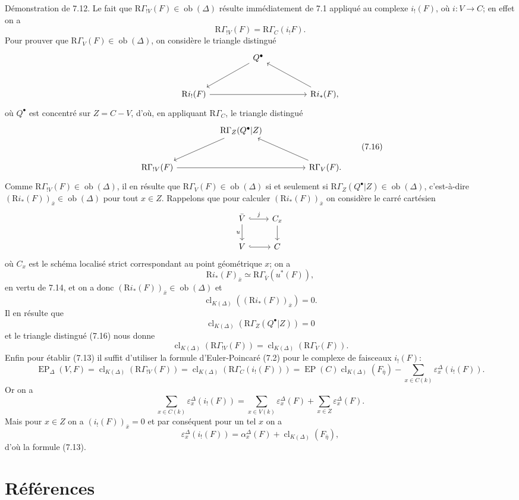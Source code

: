 \documentclass[11pt]{article}
\newcommand{\R}{\mathrm{R}}\newcommand{\RHomCore}{\mathrm{RHom}}
\providecommand{\EP}{\operatorname{EP}}
\providecommand{\Ob}{\operatorname{ob}}
\providecommand{\Ob}{\operatorname{ob}}
\providecommand{\R}{\mathrm R}
\providecommand{\EP}{\operatorname{EP}}
\providecommand{\Ob}{\operatorname{Ob}}
\providecommand{\clK}[1]{\operatorname{cl}_{K(#1)}}
\providecommand{\RG}{\R\Gamma}
\providecommand{\Ob}{\operatorname{ob}}
\providecommand{\Ob}{\operatorname{Ob}}
\begin{document}
Démonstration de 7.12. Le fait que $\RG_{!V}(F)\in\Ob(\Delta)$ résulte immédiatement de 7.1 appliqué au complexe $i_!(F)$, où $i:V\to C$; en effet on a
\[
\RG_{!V}(F)=\RG_C(i_!F).
\]
Pour prouver que $\RG_V(F)\in\Ob(\Delta)$, on considère le triangle distingué
\[
\begin{tikzcd}[column sep=huge,row sep=large]
& Q^\bullet \arrow[dl] &\\
\R i_!(F) \arrow[rr] && \R i_*(F) \arrow[ul],
\end{tikzcd}
\]
où $Q^\bullet$ est concentré sur $Z=C-V$, d'où, en appliquant $\RG_C$, le triangle distingué
\[
\begin{tikzcd}[column sep=huge,row sep=large]
& \RG_Z(Q^\bullet|Z) \arrow[dl] &\\
\RG_{!V}(F) \arrow[rr] && \RG_V(F) \arrow[ul].
\end{tikzcd}
\tag{7.16}
\]
Comme $\RG_{!V}(F)\in\Ob(\Delta)$, il en résulte que $\RG_V(F)\in\Ob(\Delta)$ si et seulement si $\RG_Z(Q^\bullet|Z)\in\Ob(\Delta)$, c'est-à-dire $(\R i_*(F))_{\bar x}\in\Ob(\Delta)$ pour tout $x\in Z$. Rappelons que pour calculer $(\R i_*(F))_{\bar x}$ on considère le carré cartésien
\[
\begin{tikzcd}
\bar V \arrow[r,hook,"j"] \arrow[d,"u"'] & C_x \arrow[d]\\
V \arrow[r,hook] & C
\end{tikzcd}
\]
où $C_x$ est le schéma localisé strict correspondant au point géométrique $x$; on a
\[
\R i_*(F)_{\bar x}\simeq \RG_{\bar V}(u^*(F)),
\]
en vertu de 7.14, et on a donc $(\R i_*(F))_{\bar x}\in\Ob(\Delta)$ et
\[
\clK{\Delta}((\R i_*(F))_{\bar x})=0.
\]
Il en résulte que
\[
\clK{\Delta}(\RG_Z(Q^\bullet|Z))=0
\]
et le triangle distingué (7.16) nous donne
\[
\clK{\Delta}(\RG_{!V}(F))=\clK{\Delta}(\RG_V(F)).
\]
Enfin pour établir (7.13) il suffit d'utiliser la formule d'Euler-Poincaré (7.2) pour le complexe de faisceaux $i_!(F)$:
\[
\EP_\Delta(V,F)
=
\clK{\Delta}(\RG_{!V}(F))
=
\clK{\Delta}(\RG_C(i_!(F)))
=
\EP(C)\clK{\Delta}(F_{\bar\eta})
-\sum_{x\in C(k)}\varepsilon_x^\Delta(i_!(F)).
\]
Or on a
\[
\sum_{x\in C(k)}\varepsilon_x^\Delta(i_!(F))
=
\sum_{x\in V(k)}\varepsilon_x^\Delta(F)
+\sum_{x\in Z}\varepsilon_x^\Delta(F).
\]
Mais pour $x\in Z$ on a $(i_!(F))_{\bar x}=0$ et par conséquent pour un tel $x$ on a
\[
\varepsilon_x^\Delta(i_!(F))
=
\alpha_x^\Delta(F)+\clK{\Delta}(F_{\bar\eta}),
\]
d'où la formule (7.13).

\section*{Références}
\end{document}
